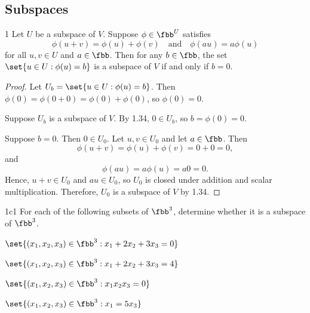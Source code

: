 \subsection{Subspaces}

\begin{lemma}{1}
    Let $U$ be a subspace of $V$.
    Suppose $\phi \in \fbb^U$ satisfies
    \[
        \phi(u + v) = \phi(u) + \phi(v) \quad \text{and} \quad \phi(au) = a\phi(u)
    \]
    for all $u, v \in U$ and $a \in \fbb$.
    Then for any $b \in \fbb$, the set $\set{u \in U : \phi(u) = b}$ is a subspace of $V$ if and only if $b = 0$.
    \begin{proof}
        Let $U_b = \set{u \in U : \phi(u) = b}$.
        Then $\phi(0) = \phi(0 + 0) = \phi(0) + \phi(0)$, so $\phi(0) = 0$.

        \rightimp Suppose $U_b$ is a subspace of $V$.
        By 1.34, $0 \in U_b$, so $b = \phi(0) = 0$.

        \leftimp Suppose $b = 0$.
        Then $0 \in U_0$.
        Let $u, v \in U_0$ and let $a \in \fbb$.
        Then
        \[
            \phi(u + v) = \phi(u) + \phi(v) = 0 + 0 = 0,
        \]
        and
        \[
            \phi(au) = a \phi(u) = a0 = 0.
        \]
        Hence, $u + v \in U_0$ and $au \in U_0$, so $U_0$ is closed under addition and scalar multiplication.
        Therefore, $U_0$ is a subspace of $V$ by 1.34.
    \end{proof}
\end{lemma}

\begin{exercise}{1c1}
    For each of the following subsets of $\fbb^3$, determine whether it is a subspace of $\fbb^3$.
    \begin{subexercises}
        \item $\set{(x_1, x_2, x_3) \in \fbb^3 : x_1 + 2x_2 + 3x_3 = 0}$
        \item $\set{(x_1, x_2, x_3) \in \fbb^3 : x_1 + 2x_2 + 3x_3 = 4}$
        \item $\set{(x_1, x_2, x_3) \in \fbb^3 : x_1x_2x_3 = 0}$
        \item $\set{(x_1, x_2, x_3) \in \fbb^3 : x_1 = 5x_3}$
    \end{subexercises}
\end{exercise}

